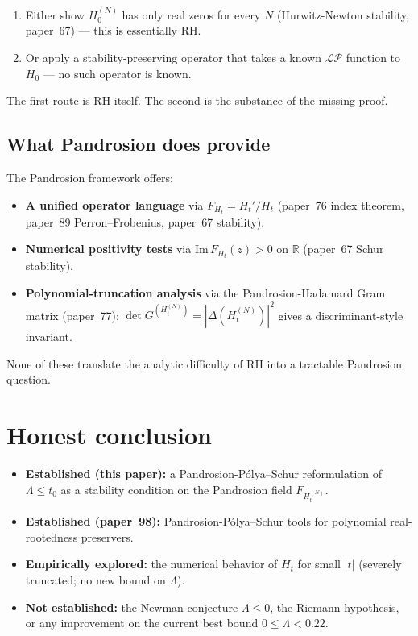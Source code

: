 \documentclass[11pt,a4paper]{article}
\begin{document}
\begin{enumerate}
\item Either show $H_0^{(N)}$ has only real zeros for every $N$
(Hurwitz-Newton stability, paper~67) --- this is essentially RH.
\item Or apply a stability-preserving operator that takes a known
$\mathcal{LP}$ function to $H_0$ --- no such operator is known.
\end{enumerate}

The first route is RH itself. The second is the substance of the missing
proof.

\subsection{What Pandrosion does provide}

The Pandrosion framework offers:

\begin{itemize}
\item \textbf{A unified operator language} via $F_{H_t} = H_t'/H_t$
(paper~76 index theorem, paper~89 Perron--Frobenius, paper~67 stability).
\item \textbf{Numerical positivity tests} via $\mathrm{Im}\, F_{H_t}(z) > 0$
on $\mathbb{R}$ (paper~67 Schur stability).
\item \textbf{Polynomial-truncation analysis} via the Pandrosion-Hadamard
Gram matrix (paper~77): $\det G^{(H_t^{(N)})} = |\Delta(H_t^{(N)})|^2$
gives a discriminant-style invariant.
\end{itemize}

None of these translate the analytic difficulty of RH into a tractable
Pandrosion question.

\section{Honest conclusion}\label{sec:conclusion}

\begin{itemize}
\item \textbf{Established (this paper):} a Pandrosion-P\'olya--Schur
reformulation of $\Lambda \le t_0$ as a stability condition on
the Pandrosion field $F_{H_t^{(N)}}$.

\item \textbf{Established (paper~98):} Pandrosion-P\'olya--Schur tools for
polynomial real-rootedness preservers.

\item \textbf{Empirically explored:} the numerical behavior of $H_t$ for
small $|t|$ (severely truncated; no new bound on $\Lambda$).

\item \textbf{Not established:} the Newman conjecture $\Lambda \le 0$,
the Riemann hypothesis, or any improvement on the current best bound
$0 \le \Lambda < 0.22$.
\end{itemize}
\end{document}
